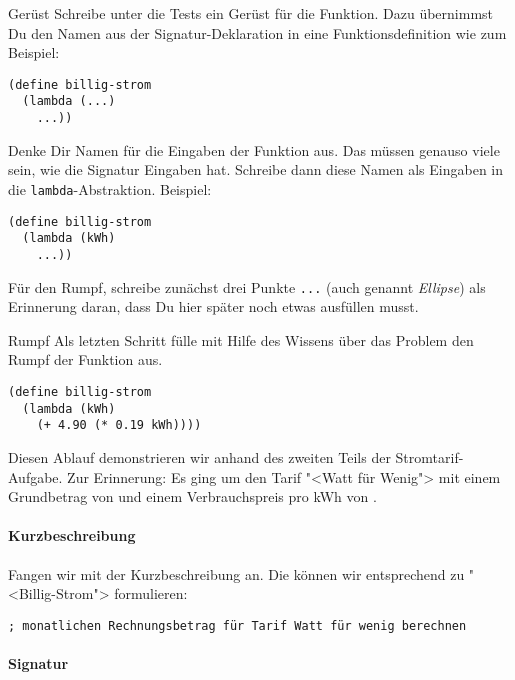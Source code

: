 \begin{konstruktionsanleitung}{Gerüst}
  \label{ka:geruest}
  Schreibe unter die Tests ein Gerüst für die Funktion. Dazu
  übernimmst Du den Namen aus der Signatur-Deklaration in eine
  Funktionsdefinition wie zum Beispiel:
\begin{lstlisting}
(define billig-strom
  (lambda (...)
    ...))
\end{lstlisting}
  Denke Dir Namen für die Eingaben der Funktion aus.  Das müssen
  genauso viele sein, wie die Signatur Eingaben hat.  Schreibe dann
  diese Namen als Eingaben in die \lstinline{lambda}-Abstraktion.
  Beispiel:
  \begin{lstlisting}
(define billig-strom
  (lambda (kWh)
    ...))
\end{lstlisting}
  Für den Rumpf, schreibe zunächst drei Punkte \lstinline{...} (auch
  genannt \textit{Ellipse}) als Erinnerung daran, dass
  Du hier später noch etwas ausfüllen musst.
\end{konstruktionsanleitung}

\begin{konstruktionsanleitung}{Rumpf}
  \label{ka:rumpf}
  Als letzten Schritt fülle mit Hilfe des Wissens über das Problem
  den Rumpf der Funktion aus.
\begin{lstlisting}
(define billig-strom
  (lambda (kWh)
    (+ 4.90 (* 0.19 kWh))))
\end{lstlisting}
\end{konstruktionsanleitung}

Diesen Ablauf demonstrieren wir anhand des zweiten Teils der
Stromtarif-Aufgabe.
Zur Erinnerung:  Es ging um den Tarif
"<Watt für Wenig"> mit einem Grundbetrag von  und einem
Verbrauchspreis pro kWh von .

\paragraph{Kurzbeschreibung}

Fangen wir mit der Kurzbeschreibung an.  Die können wir entsprechend
zu "<Billig-Strom"> formulieren:
\begin{lstlisting}
; monatlichen Rechnungsbetrag für Tarif Watt für wenig berechnen
\end{lstlisting}

\paragraph{Signatur}

